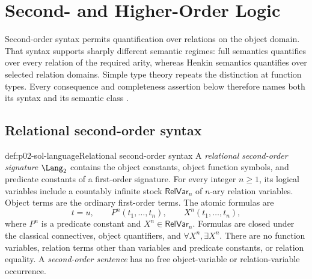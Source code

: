 
\chapter{Second- and Higher-Order Logic}
\label{sec:p02-second-and-higher-order-logic}

Second-order syntax permits quantification over relations on the object
domain.  That syntax supports sharply different semantic regimes: full
semantics quantifies over every relation of the required arity, whereas
Henkin semantics quantifies over selected relation domains.  Simple type
theory repeats the distinction at function types.  Every consequence and
completeness assertion below therefore names both its syntax and its semantic
class \cite{Henkin1950,Manzano1996,BarwiseFeferman1985}.

\section{Relational second-order syntax}
\label{sec:p02-sol-syntax}

\begin{hbdefinition}{def:p02-sol-language}{Relational second-order syntax}
A \emph{relational second-order signature} \(\Lang_2\) contains the object
constants, object function symbols, and predicate constants of a first-order
signature.  For every integer \(n\geq1\), its logical variables include a
countably infinite stock \(\mathsf{RelVar}_n\) of \(n\)-ary relation
variables.  Object terms are the ordinary first-order terms.  The atomic
formulas are
\[
  t=u,\qquad P^n(t_1,\ldots,t_n),\qquad X^n(t_1,\ldots,t_n),
\]
where \(P^n\) is a predicate constant and
\(X^n\in\mathsf{RelVar}_n\).  Formulas are closed under the classical
connectives, object quantifiers, and
\(\forall X^n,\exists X^n\).  There are no function variables, relation
terms other than variables and predicate constants, or relation equality.
A \emph{second-order sentence} has no free object-variable or
relation-variable occurrence.
\end{hbdefinition}

